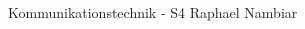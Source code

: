 \documentclass[10pt, a4paper, landscape]{extarticle}
\begin{document}
\begin{multicols*}{3}

    \DocumentInfo
    {Kommunikationstechnik - S4} %
    {Raphael Nambiar} %

    
    
    
    
    
    
    
    
\end{multicols*}
\begin{multicols*}{2}
    
\end{multicols*}
\end{document}
